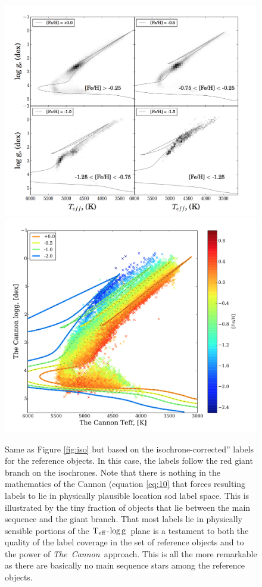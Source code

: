 \documentclass[12pt, preprint]{aastex}
\newcommand{\teff}{\mbox{$\rm T_{eff}$}}
\newcommand{\logg}{\mbox{$\rm \log g$}}
\newcommand{\tc}{\textsl{The~Cannon}}
\begin{document}
\begin{figure}[!h]
      \includegraphics[scale=0.25]{./plots/iso2.png}
  \hspace{-20pt}
    \includegraphics[scale=0.25]{./plots/iso2a.png}
\caption{Same as Figure \ref{fig:iso} but based on the isochrone-corrected'' labels for the reference objects. In this case, the labels follow the red giant branch on the isochrones. Note that there is nothing in the mathematics of the Cannon (equation \ref{eq:10} that forces resulting labels to lie in physically plausible location sod label space. This is illustrated by the tiny fraction of objects that lie between the main sequence and the giant branch. That most labels lie in physically sensible portions of the \teff-\logg\ plane is a testament to both the quality of the label coverage in the set of reference objects and to the power of \tc\ approach. This is all the more remarkable as there are basically no main sequence stars among the reference objects.}
\label{fig:iso2}
\end{figure}
\end{document}
